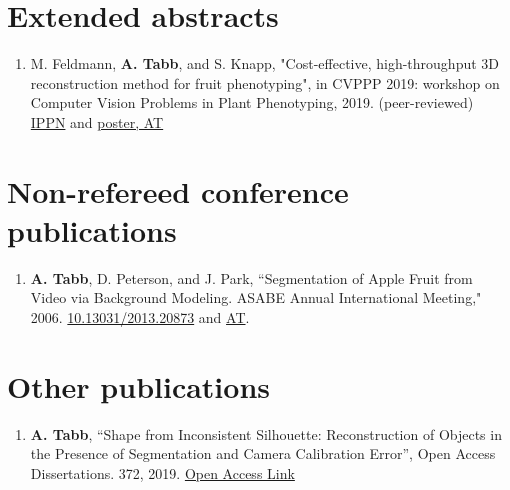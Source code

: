 \documentclass[letterpaper,11pt]{article}
\begin{document}
\section{Extended abstracts}
\begin{enumerate}[noitemsep, leftmargin=*,label={}]
\item{M. Feldmann, \textbf{A. Tabb}, and S. Knapp, "Cost-effective, high-throughput 3D reconstruction method for fruit phenotyping", in CVPPP 2019: workshop on Computer Vision Problems in Plant Phenotyping, 2019. (peer-reviewed) \href{https://www.plant-phenotyping.org/lw_resource/datapool/systemfiles/elements/files/a1abf372-7552-11e9-b1c5-dead53a91d31/current/document/FeldmannCVPPP2019.pdf}{IPPN} and \href{https://amytabb.com/pubs/CVPPP2019-poster.pdf}{poster, AT}}
\end{enumerate}

\section{Non-refereed conference publications}
\begin{enumerate}[noitemsep, leftmargin=*,label={}]
\item{\textbf{A. Tabb}, D. Peterson, and J. Park, ``Segmentation of Apple Fruit from Video via Background Modeling. ASABE Annual International Meeting," 2006.  \href{https://elibrary.asabe.org/abstract.asp?aid=20873}{10.13031/2013.20873} and \href{https://amytabb.com/pubs/Tabb_06_segmentation_of_apple_fruit_from_video_via_background_modeling.pdf}{AT}.}
\end{enumerate}

\section{Other publications}
\begin{enumerate}[noitemsep, leftmargin=*,label={}]
\item{\textbf{A. Tabb},  ``Shape from Inconsistent Silhouette: Reconstruction of Objects in the Presence of Segmentation and Camera Calibration Error'', Open Access Dissertations. 372, 2019.  \href{https://docs.lib.purdue.edu/open_access_dissertations/372/}{Open Access Link}}
\end{enumerate}

\end{document}

